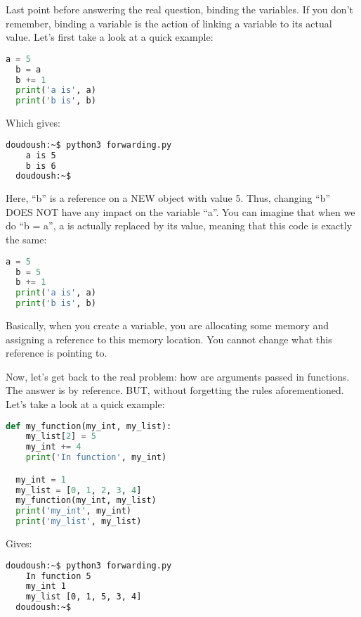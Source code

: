 \vspace{5mm}

Last point before answering the real question, binding the variables. If you don't
remember, binding a variable is the action of linking a variable to its actual value.
Let's first take a look at a quick example:

\begin{lstlisting}[language=python]
  a = 5
  b = a
  b += 1
  print('a is', a)
  print('b is', b)
\end{lstlisting}

Which gives:

\begin{lstlisting}[language=bash]
  doudoush:~$ python3 forwarding.py
    a is 5
    b is 6
  doudoush:~$
\end{lstlisting}

Here, ``b'' is a reference on a NEW object with value 5. Thus, changing ``b'' DOES NOT have any impact
on the variable ``a''. You can imagine that when we do ``b = a'', a is actually replaced by its value,
meaning that this code is exactly the same:

\begin{lstlisting}[language=python]
  a = 5
  b = 5
  b += 1
  print('a is', a)
  print('b is', b)
\end{lstlisting}

Basically, when you create a variable, you are allocating some memory and assigning a reference
to this memory location. You cannot change what this reference is pointing to.

\vspace{5mm}
Now, let's get back to the real problem: how are arguments passed in functions. The answer is by reference.
BUT, without forgetting the rules aforementioned. Let's take a look at a quick example:

\begin{lstlisting}[language=python]
  def my_function(my_int, my_list):
    my_list[2] = 5
    my_int += 4
    print('In function', my_int)

  my_int = 1
  my_list = [0, 1, 2, 3, 4]
  my_function(my_int, my_list)
  print('my_int', my_int)
  print('my_list', my_list)
\end{lstlisting}

Gives:

\begin{lstlisting}[language=bash]
  doudoush:~$ python3 forwarding.py
    In function 5
    my_int 1
    my_list [0, 1, 5, 3, 4]
  doudoush:~$
\end{lstlisting}

